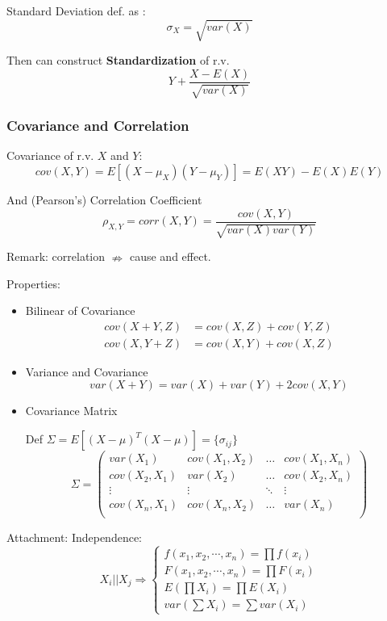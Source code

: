 \documentclass[11pt,a4paper]{ctexart}
\numberwithin{equation}{section}%
\begin{document}
    Standard Deviation def. as :
    \[\sigma_X=\sqrt{var(X)}\]

    Then can construct \textbf{Standardization} of r.v.
    \[Y+\frac{X-E(X)}{\sqrt{var(X)}}\]


\subsubsection{Covariance and Correlation}
    Covariance of r.v. $X$ and $Y$:\[
        cov(X,Y)=E[(X-\mu_X)(Y-\mu_Y)]=E(XY)-E(X)E(Y)
    \]

    And (Pearson's) Correlation Coefficient\[
        \rho_{X,Y}=corr(X,Y)=\frac{cov(X,Y)}{\sqrt{var(X)var(Y)}}
    \]

    Remark: correlation $\nRightarrow$ cause and effect.

    Properties:
\begin{itemize}
\item Bilinear of Covariance\begin{align*}
    cov(X+Y,Z)&=cov(X,Z)+cov(Y,Z)\\
    cov(X,Y+Z)&=cov(X,Y)+cov(X,Z)
\end{align*}
    
\item Variance and Covariance\[
    var(X+Y)=var(X)+var(Y)+2cov(X,Y)
\]
\item Covariance Matrix

    Def $\Sigma=E[(X-\mu)^T(X-\mu)]=\{\sigma_{ij}\}$
\begin{equation}\label{covariancematrix}
    \Sigma=
        \begin{pmatrix}
        var(X_1) & cov(X_1,X_2) & \ldots & cov(X_1,X_n)\\
        cov(X_2,X_1) & var(X_2) & \ldots & cov(X_2,X_n)\\
        \vdots & \vdots & \ddots & \vdots\\
        cov(X_n,X_1) & cov(X_n,X_2) & \ldots & var(X_n)\\
        \end{pmatrix}    
    \end{equation}
\end{itemize}

Attachment: Independence:\[
    X_i || X_j\Rightarrow \begin{cases}
        f(x_1,x_2,\cdots,x_n)=\prod f(x_i)\\
        F(x_1,x_2,\cdots,x_n)=\prod F(x_i)\\
        E(\prod X_i)=\prod E(X_i)\\
        var(\sum X_i)=\sum var(X_i)
    \end{cases}
\]
\end{document}
